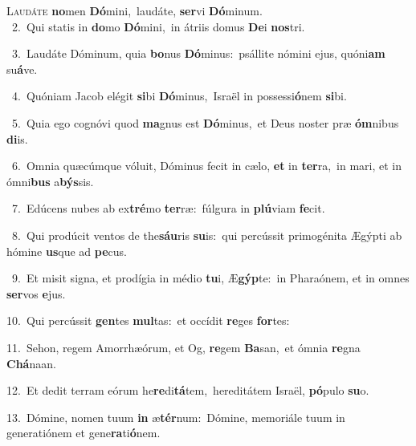 \lettrine{\initial\textcolor{\initialcolor}{L}}{audáte} \textbf{no}\-men \textbf{Dó}\-mini,~\star laudáte, \textbf{ser}\-vi \textbf{Dó}\-minum.\\
{\numbfont\textcolor{\numbcolor}{~2.}}~Qui statis in \textbf{do}\-mo \textbf{Dó}\-mini,~\star in átriis domus \textbf{De}\-i \textbf{nos}\-tri.\par
{\numbfont\textcolor{\numbcolor}{~3.}}~Laudáte Dóminum, quia \textbf{bo}\-nus \textbf{Dó}\-minus:~\star psállite nómini ejus, quóni\textbf{am} su\-\textbf{á}\-ve.\par
{\numbfont\textcolor{\numbcolor}{~4.}}~Quóniam Jacob elégit \textbf{si}\-bi \textbf{Dó}\-minus,~\star Israël in possessi\-\textbf{ó}\-nem \textbf{si}\-bi.\par
{\numbfont\textcolor{\numbcolor}{~5.}}~Quia ego cognóvi quod \textbf{ma}\-gnus est \textbf{Dó}\-minus,~\star et Deus noster præ \textbf{óm}\-nibus \textbf{di}\-is.\par
{\numbfont\textcolor{\numbcolor}{~6.}}~Omnia quæcúmque vóluit, Dóminus fecit in cælo, \textbf{et} in \textbf{ter}\-ra,~\star in mari, et in ómni\textbf{bus} a\-\textbf{býs}\-sis.\par
{\numbfont\textcolor{\numbcolor}{~7.}}~Edúcens nubes ab ex\-\textbf{tré}\-mo \textbf{ter}\-ræ:~\star fúlgura in \textbf{plú}\-viam \textbf{fe}\-cit.\par
{\numbfont\textcolor{\numbcolor}{~8.}}~Qui prodúcit ventos de the\-\textbf{sáu}\-ris \textbf{su}\-is:~\star qui percússit primogénita Ægýpti ab hómine \textbf{us}\-que ad \textbf{pe}\-cus.\par
{\numbfont\textcolor{\numbcolor}{~9.}}~Et misit signa, et prodígia in médio \textbf{tu}\-i, Æ\-\textbf{gýp}\-te:~\star in Pharaónem, et in omnes \textbf{ser}\-vos \textbf{e}\-jus.\par
{\numbfont\textcolor{\numbcolor}{10.}}~Qui percússit \textbf{gen}\-tes \textbf{mul}\-tas:~\star et occídit \textbf{re}\-ges \textbf{for}\-tes:\par
{\numbfont\textcolor{\numbcolor}{11.}}~Sehon, regem Amorrhæórum, et Og, \textbf{re}\-gem \textbf{Ba}\-san,~\star et ómnia \textbf{re}\-gna \textbf{Chá}\-naan.\par
{\numbfont\textcolor{\numbcolor}{12.}}~Et dedit terram eórum he\-\textbf{re}\-di\-\textbf{tá}\-tem,~\star hereditátem Israël, \textbf{pó}\-pulo \textbf{su}\-o.\par
{\numbfont\textcolor{\numbcolor}{13.}}~Dómine, nomen tuum \textbf{in} æ\-\textbf{tér}\-num:~\star Dómine, memoriále tuum in generatiónem et gene\-\textbf{ra}\-ti\-\textbf{ó}\-nem.\par
